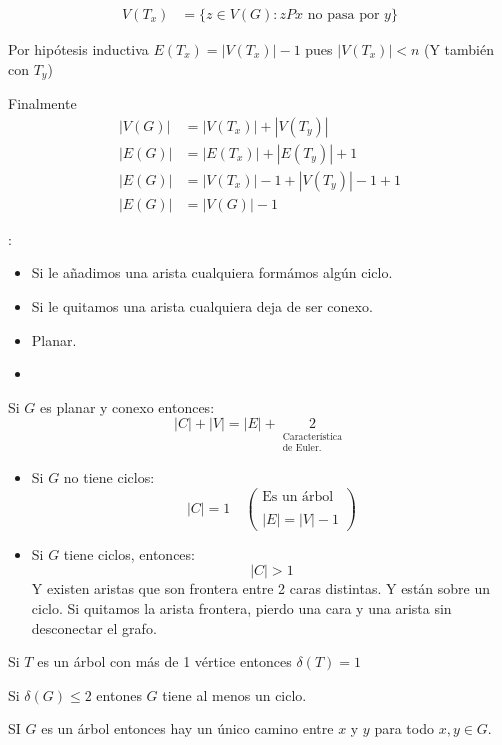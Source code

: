 \documentclass[../main.tex]{subfiles}
\begin{document}
\begin{figure}[H]
	\centering
	
\end{figure}

\begin{figure}[H]
	\centering
	
\end{figure}

\begin{align*}
	V(T_x) &=
	\{
		z\in V(G):
		zPx\text{ no pasa por $y$}
	\}
\end{align*}

Por hipótesis inductiva $E(T_x)=|V(T_x)|-1$ pues $|V(T_x)| < n$
(Y también con $T_y$)

Finalmente
\begin{align*}
	|V(G)| &= |V(T_x)| + |V(T_y)|\\
	|E(G)| &= |E(T_x)| + |E(T_y)| +1\\
	|E(G)| &= |V(T_x)| - 1 + |V(T_y)| - 1 + 1\\
	|E(G)| &= |V(G)| - 1
\end{align*}

:
\begin{itemize}
	\item {}
		{Si le añadimos una arista cualquiera formámos algún ciclo.}
	\item {}
		{Si le quitamos una arista cualquiera deja de ser conexo.}
	\item Planar.
	\item {}
\end{itemize}

Si $G$ es planar y conexo entonces:
\[
	|C| + |V| = |E| +
	\underset
	{
		\substack
		{
			\text{Característica}\\
			\text{de Euler.}
		}
	}
	{
		2
	}
\]

\begin{itemize}
	\item Si $G$ no tiene ciclos:
		\[
			|C| = 1 \quad
			\left(
				\substack
				{
					\text{Es un árbol}\\
					\text{}\\
					|E| = |V|-1
				}
			\right)
		\]

	\item Si $G$ tiene ciclos, entonces:
		\[
			|C| > 1
		\]
		Y existen aristas que son frontera entre 2 caras distintas.
		Y están sobre un ciclo.
		Si quitamos la arista frontera, pierdo una cara y una arista sin
		desconectar el grafo.
\end{itemize}

\begin{figure}[H]
	\centering
	
\end{figure}


\tarea
Si $T$ es un árbol con más de 1 vértice entonces $\delta(T)=1$

Si $\delta(G)\leq 2$ entones $G$ tiene al menos un ciclo.

SI $G$ es un árbol entonces hay un único camino entre $x$ y $y$ para todo
$x,y \in G$.
\end{document}
